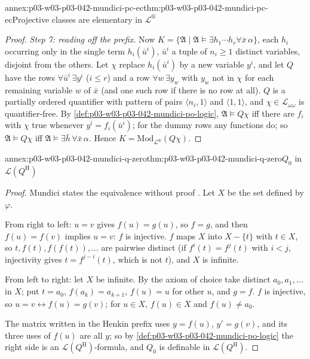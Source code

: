 \begin{annexitem}{annex:p03-w03-p03-042-mundici-pc-ec}{thm:p03-w03-p03-042-mundici-pc-ec}{Projective classes are elementary in \(\mathscr L^{\circledR}\)}
\begin{proof}
\emph{Step 7: reading off the prefix.}  Now \(K=\{\mathfrak A\mid\mathfrak
A\models\exists h_1\cdots h_r\forall\bar x\,\alpha\}\), each \(h_i\)
occurring only in the single term \(h_i(\bar u^i)\), \(\bar u^i\) a tuple of
\(n_i\geq1\) distinct variables, disjoint from the others.  Let \(\chi\)
replace \(h_i(\bar u^i)\) by a new variable \(y^i\), and let \(Q\) have the
rows \(\forall\bar u^i\,\exists y^i\) (\(i\le r\)) and a row \(\forall
w\,\exists y_w\) with \(y_w\) not in \(\chi\) for each remaining variable
\(w\) of \(\bar x\) (and one such row if there is no row at all).  \(Q\) is
a partially ordered quantifier with pattern of pairs \(\langle
n_i,1\rangle\) and \(\langle1,1\rangle\), and \(\chi\in\mathscr
L_{\omega\omega}\) is quantifier-free.  By
\cref{def:p03-w03-p03-042-mundici-po-logic}, \(\mathfrak A\models Q\chi\)
iff there are \(f_i\) with \(\chi\) true whenever \(y^i=f_i(\bar u^i)\);
for the dummy rows any functions do; so \(\mathfrak A\models Q\chi\) iff
\(\mathfrak A\models\exists\bar h\,\forall\bar x\,\alpha\).  Hence
\(K=\mathrm{Mod}_{\mathscr L^{\circledR}}(Q\chi)\).
\end{proof}
\end{annexitem}

\begin{annexitem}{annex:p03-w03-p03-042-mundici-q-zero}{thm:p03-w03-p03-042-mundici-q-zero}{\(Q_0\) in \(\mathscr L(Q^{\mathrm H})\)}
\begin{proof}
Mundici states the equivalence without proof
\cite[p.~216]{Mundici1985OtherQuantifiers}.  Let \(X\) be the set
defined by \(\varphi\).

From right to left: \(u=v\) gives \(f(u)=g(u)\), so \(f=g\), and then
\(f(u)=f(v)\) implies \(u=v\): \(f\) is injective.  \(f\) maps \(X\) into
\(X-\{t\}\) with \(t\in X\), so \(t,f(t),f(f(t)),\ldots\) are pairwise
distinct (if \(f^i(t)=f^j(t)\) with \(i<j\), injectivity gives
\(t=f^{j-i}(t)\), which is not \(t\)), and \(X\) is infinite.

From left to right: let \(X\) be infinite.  By the axiom of choice take
distinct \(a_0,a_1,\ldots\) in \(X\); put \(t=a_0\), \(f(a_k)=a_{k+1}\),
\(f(u)=u\) for other \(u\), and \(g=f\).  \(f\) is injective, so
\(u=v\leftrightarrow f(u)=g(v)\); for \(u\in X\), \(f(u)\in X\) and
\(f(u)\neq a_0\).

The matrix written in the Henkin prefix uses \(y=f(u)\), \(y'=g(v)\), and
its three uses of \(f(u)\) are all \(y\); so by
\cref{def:p03-w03-p03-042-mundici-po-logic} the right side is an
\(\mathscr L(Q^{\mathrm H})\)-formula, and \(Q_0\) is definable in
\(\mathscr L(Q^{\mathrm H})\).
\end{proof}
\end{annexitem}


